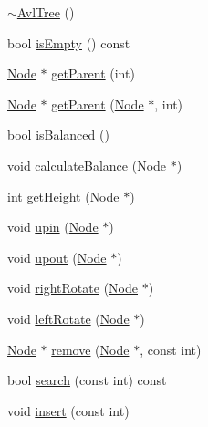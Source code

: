 \begin{DoxyCompactItemize}
\item 
\mbox{\hyperlink{class_avl_tree_ada89cb30925d36a56e3aab8768752468}{$\sim$\+Avl\+Tree}} ()
\item 
bool \mbox{\hyperlink{class_avl_tree_a62de2a25d97e2da309696ea2eef3fec4}{is\+Empty}} () const
\item 
\mbox{\hyperlink{struct_avl_tree_1_1_node}{Node}} $\ast$ \mbox{\hyperlink{class_avl_tree_ab48adaa9a4e224e2aaeb9c3f7732f5ba}{get\+Parent}} (int)
\item 
\mbox{\hyperlink{struct_avl_tree_1_1_node}{Node}} $\ast$ \mbox{\hyperlink{class_avl_tree_af64d3251ddc4687a6431c444896d0676}{get\+Parent}} (\mbox{\hyperlink{struct_avl_tree_1_1_node}{Node}} $\ast$, int)
\item 
bool \mbox{\hyperlink{class_avl_tree_af8f43d1139179e490fffbdd03f7735ac}{is\+Balanced}} ()
\item 
void \mbox{\hyperlink{class_avl_tree_a67133995c419d71beb98d55073ca4e50}{calculate\+Balance}} (\mbox{\hyperlink{struct_avl_tree_1_1_node}{Node}} $\ast$)
\item 
int \mbox{\hyperlink{class_avl_tree_acc21a0655380662e65d92da67c559377}{get\+Height}} (\mbox{\hyperlink{struct_avl_tree_1_1_node}{Node}} $\ast$)
\item 
void \mbox{\hyperlink{class_avl_tree_a82534eb18fc1294d06f769e4259cd6c2}{upin}} (\mbox{\hyperlink{struct_avl_tree_1_1_node}{Node}} $\ast$)
\item 
void \mbox{\hyperlink{class_avl_tree_a6e78b2e17818b32ff2716e50b844cc6c}{upout}} (\mbox{\hyperlink{struct_avl_tree_1_1_node}{Node}} $\ast$)
\item 
void \mbox{\hyperlink{class_avl_tree_adeeb1c5c0d60556f57f775386fd023b4}{right\+Rotate}} (\mbox{\hyperlink{struct_avl_tree_1_1_node}{Node}} $\ast$)
\item 
void \mbox{\hyperlink{class_avl_tree_a571fee829f821ecaf4dd701df033429c}{left\+Rotate}} (\mbox{\hyperlink{struct_avl_tree_1_1_node}{Node}} $\ast$)
\item 
\mbox{\hyperlink{struct_avl_tree_1_1_node}{Node}} $\ast$ \mbox{\hyperlink{class_avl_tree_a156d81b7e3c6974c969876f48578e0d8}{remove}} (\mbox{\hyperlink{struct_avl_tree_1_1_node}{Node}} $\ast$, const int)
\item 
bool \mbox{\hyperlink{class_avl_tree_a7d2d75cb18efd7064a194e5eba60ceed}{search}} (const int) const
\item 
void \mbox{\hyperlink{class_avl_tree_acf5a845217dd1d6c060951c78eb4b3c0}{insert}} (const int)

\end{DoxyCompactItemize}
